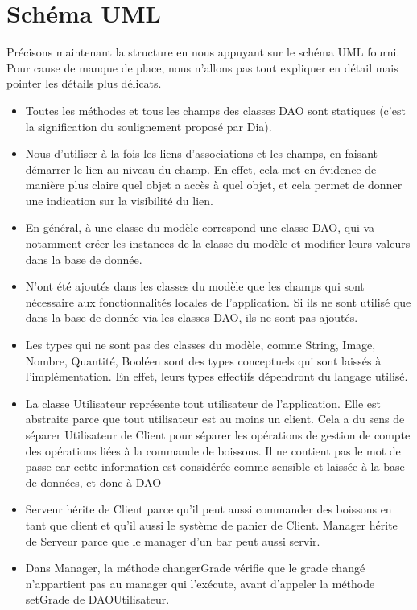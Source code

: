 \documentclass[a4paper,10pt]{article}
\begin{document}
\section{Schéma UML}

Précisons maintenant la structure en nous appuyant sur le schéma UML fourni. Pour cause de manque de place, nous n'allons pas tout expliquer en détail mais pointer les détails plus délicats.

\begin{itemize}
    \item Toutes les méthodes et tous les champs des classes DAO sont statiques (c'est la signification du soulignement proposé par Dia).
    \item Nous d'utiliser à la fois les liens d'associations et les champs, en faisant démarrer le lien au niveau du champ. En effet, cela met en évidence de manière plus claire quel objet a accès à quel objet, et cela permet de donner une indication sur la visibilité du lien.
    \item En général, à une classe du modèle correspond une classe DAO, qui va notamment créer les instances de la classe du modèle et modifier leurs valeurs dans la base de donnée.
    \item N'ont été ajoutés dans les classes du modèle que les champs qui sont nécessaire aux fonctionnalités locales de l'application. Si ils ne sont utilisé que dans la base de donnée via les classes DAO, ils ne sont pas ajoutés.
    \item Les types qui ne sont pas des classes du modèle, comme String, Image, Nombre, Quantité, Booléen sont des types conceptuels qui sont laissés à l'implémentation. En effet, leurs types effectifs dépendront du langage utilisé.
    \item La classe Utilisateur représente tout utilisateur de l'application. Elle est abstraite parce que tout utilisateur est au moins un client. Cela a du sens de séparer Utilisateur de Client pour séparer les opérations de gestion de compte des opérations liées à la commande de boissons. Il ne contient pas le mot de passe car cette information est considérée comme sensible et laissée à la base de données, et donc à DAO
    \item Serveur hérite de Client parce qu'il peut aussi commander des boissons en tant que client et qu'il aussi le système de panier de Client. Manager hérite de Serveur parce que le manager d'un bar peut aussi servir.
    \item Dans Manager, la méthode changerGrade vérifie que le grade changé n'appartient pas au manager qui l'exécute, avant d'appeler la méthode setGrade de DAOUtilisateur.

\end{itemize}
\end{document}
